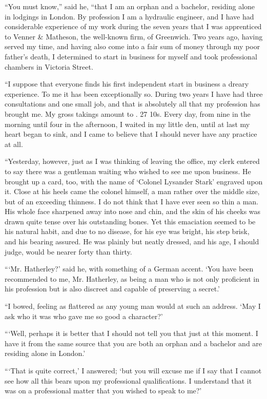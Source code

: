 \documentclass{article}
\begin{document}
``You must know,'' said he, ``that I am an orphan and a bachelor, residing
alone in lodgings in London. By profession I am a hydraulic engineer,
and I have had considerable experience of my work during the seven years
that I was apprenticed to Venner \& Matheson, the well-known firm, of
Greenwich. Two years ago, having served my time, and having also come into
a fair sum of money through my poor father's death, I determined to start
in business for myself and took professional chambers in Victoria Street.

``I suppose that everyone finds his first independent start in business
a dreary experience. To me it has been exceptionally so. During two years
I have had three consultations and one small job, and that is absolutely
all that my profession has brought me. My gross takings amount to . 27
10s. Every day, from nine in the morning until four in the afternoon,
I waited in my little den, until at last my heart began to sink, and I
came to believe that I should never have any practice at all.

``Yesterday, however, just as I was thinking of leaving the office,
my clerk entered to say there was a gentleman waiting who wished to
see me upon business. He brought up a card, too, with the name of
`Colonel Lysander Stark' engraved upon it. Close at his heels came the
colonel himself, a man rather over the middle size, but of an exceeding
thinness. I do not think that I have ever seen so thin a man. His whole
face sharpened away into nose and chin, and the skin of his cheeks was
drawn quite tense over his outstanding bones. Yet this emaciation seemed
to be his natural habit, and due to no disease, for his eye was bright,
his step brisk, and his bearing assured. He was plainly but neatly
dressed, and his age, I should judge, would be nearer forty than thirty.

```Mr. Hatherley?' said he, with something of a German accent. `You
have been recommended to me, Mr. Hatherley, as being a man who is not
only proficient in his profession but is also discreet and capable of
preserving a secret.'

``I bowed, feeling as flattered as any young man would at such an
address. `May I ask who it was who gave me so good a character?'

```Well, perhaps it is better that I should not tell you that just at
this moment. I have it from the same source that you are both an orphan
and a bachelor and are residing alone in London.'

```That is quite correct,' I answered; `but you will excuse me
if I say that I cannot see how all this bears upon my professional
qualifications. I understand that it was on a professional matter that
you wished to speak to me?'
\end{document}
